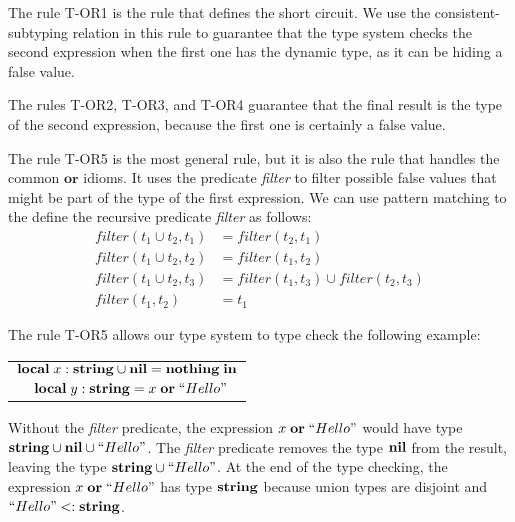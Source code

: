 The rule \textsc{T-OR1} is the rule that defines the short circuit.
We use the consistent-subtyping relation in this rule to guarantee that
the type system checks the second expression when the first one
has the dynamic type, as it can be hiding a false value.

The rules \textsc{T-OR2}, \textsc{T-OR3}, and \textsc{T-OR4} guarantee
that the final result is the type of the second expression, because the
first one is certainly a false value.

The rule \textsc{T-OR5} is the most general rule, but it is also
the rule that handles the common $\mathbf{or}$ idioms.
It uses the predicate \emph{filter} to filter possible false values
that might be part of the type of the first expression.
We can use pattern matching to the define the recursive predicate
\emph{filter} as follows:
\begin{align*}
filter(t_{1} \cup t_{2}, t_{1}) & = filter(t_{2}, t_{1})\\
filter(t_{1} \cup t_{2}, t_{2}) & = filter(t_{1}, t_{2})\\
filter(t_{1} \cup t_{2}, t_{3}) & = filter(t_{1}, t_{3}) \cup filter(t_{2}, t_{3})\\
filter(t_{1}, t_{2}) & = t_{1}
\end{align*}

The rule \textsc{T-OR5} allows our type system to type check the following example:
\begin{center}
\begin{tabular}{ll}
\multicolumn{2}{l}{$\mathbf{local} \; x:\mathbf{string} \cup \mathbf{nil} = \mathbf{nothing} \; \mathbf{in}$}\\
& \multicolumn{1}{l}{$\mathbf{local} \; y:\mathbf{string} = x \; \mathbf{or} \; ``Hello"$}
\end{tabular}
\end{center}

Without the \emph{filter} predicate,
the expression $x \; \mathbf{or} \; ``Hello"$ would have type
$\mathbf{string} \cup \mathbf{nil} \cup ``Hello"$.
The \emph{filter} predicate removes the type $\mathbf{nil}$ from the result,
leaving the type $\mathbf{string} \cup ``Hello"$.
At the end of the type checking, the expression $x \; \mathbf{or} \; ``Hello"$
has type $\mathbf{string}$ because union types are disjoint and $``Hello" <: \mathbf{string}$.

